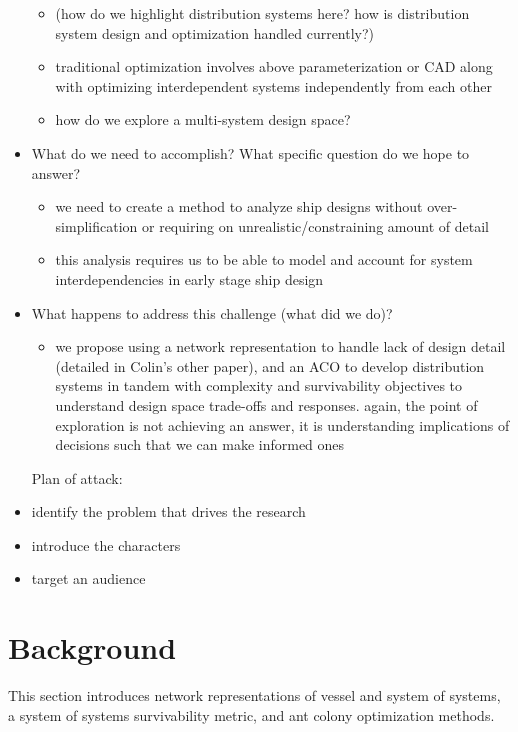 \documentclass[preprint,12pt]{elsarticle}
\begin{document}
\begin{itemize}
\begin{itemize}
		\item (how do we highlight distribution systems here? how is distribution system design and optimization handled currently?)
		\item traditional optimization involves above parameterization or CAD along with optimizing interdependent systems independently from each other
		\item how do we explore a multi-system design space?
	\end{itemize}
	\item What do we need to accomplish? What specific question do we hope to answer?
	\begin{itemize}
		\item we need to create a method to analyze ship designs without over-simplification or requiring on unrealistic/constraining amount of detail
		\item this analysis requires us to be able to model and account for system interdependencies in early stage ship design
	\end{itemize}
	\item What happens to address this challenge (what did we do)?
	\begin{itemize}
		\item we propose using a network representation to handle lack of design detail (detailed in Colin's other paper), and an ACO to develop distribution systems in tandem with complexity and survivability objectives to understand design space trade-offs and responses. again, the point of exploration is not achieving an answer, it is understanding implications of decisions such that we can make informed ones
	\end{itemize}
\end{itemize}
\begin{itemize}
	\item[Plan of attack:]
	\item identify the problem that drives the research
	\item introduce the characters
	\item target an audience
\end{itemize}

%
%

\section{Background}
This section introduces network representations of vessel and system of systems, a system of systems survivability metric, and ant colony optimization methods.
\end{document}
